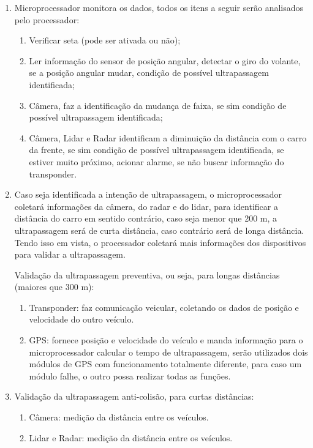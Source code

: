 \begin{enumerate}

\item Microprocessador monitora os dados, todos os itens a seguir serão analisados pelo processador:

\begin{enumerate}
	\item Verificar seta (pode ser ativada ou não);
	\item Ler informação do sensor de posição angular, detectar o giro do volante, se a posição angular mudar, condição de possível ultrapassagem identificada;
	\item Câmera, faz a identificação da mudança de faixa, se sim condição de possível ultrapassagem identificada;
	\item Câmera, Lidar e Radar identificam a diminuição da distância com o carro da frente, se sim condição de possível ultrapassagem identificada, se estiver muito próximo, acionar alarme, se não buscar informação do transponder.
\end{enumerate}

\item Caso seja identificada a intenção de ultrapassagem, o microprocessador coletará informações da câmera, do radar e do lidar, para identificar a distância do carro em sentido contrário, caso seja menor que 200 m, a ultrapassagem será de curta distância, caso contrário será de longa distância. Tendo isso em vista, o processador coletará mais informações dos dispositivos para validar a ultrapassagem.

Validação da ultrapassagem preventiva, ou seja, para longas distâncias (maiores que 300 m):

\begin{enumerate}
	\item Transponder: faz comunicação veicular, coletando os dados de posição e velocidade do outro veículo.
	\item GPS: fornece posição e velocidade do veículo e manda informação para o microprocessador calcular o tempo de ultrapassagem, serão utilizados dois módulos de GPS com funcionamento totalmente diferente, para caso um módulo falhe, o outro possa realizar todas as funções.
\end{enumerate}

\item Validação da ultrapassagem anti-colisão, para curtas distâncias:

\begin{enumerate}
	\item Câmera: medição da distância entre os veículos.
	\item Lidar e Radar: medição da distância entre os veículos.
\end{enumerate}


\end{enumerate}
